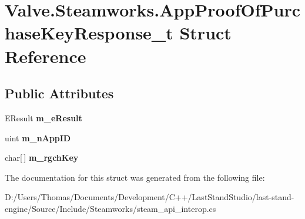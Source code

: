 \hypertarget{structValve_1_1Steamworks_1_1AppProofOfPurchaseKeyResponse__t}{}\section{Valve.\+Steamworks.\+App\+Proof\+Of\+Purchase\+Key\+Response\+\_\+t Struct Reference}
\label{structValve_1_1Steamworks_1_1AppProofOfPurchaseKeyResponse__t}
\subsection*{Public Attributes}
\begin{DoxyCompactItemize}
\item 
\hypertarget{structValve_1_1Steamworks_1_1AppProofOfPurchaseKeyResponse__t_abcb40b93a942c7a7b2475c676a807679}{}E\+Result {\bfseries m\+\_\+e\+Result}\label{structValve_1_1Steamworks_1_1AppProofOfPurchaseKeyResponse__t_abcb40b93a942c7a7b2475c676a807679}

\item 
\hypertarget{structValve_1_1Steamworks_1_1AppProofOfPurchaseKeyResponse__t_ac9119233dffae29b25286fbe687e32ee}{}uint {\bfseries m\+\_\+n\+App\+I\+D}\label{structValve_1_1Steamworks_1_1AppProofOfPurchaseKeyResponse__t_ac9119233dffae29b25286fbe687e32ee}

\item 
\hypertarget{structValve_1_1Steamworks_1_1AppProofOfPurchaseKeyResponse__t_ad1a0454bbaf073887abac25341afc82c}{}char\mbox{[}$\,$\mbox{]} {\bfseries m\+\_\+rgch\+Key}\label{structValve_1_1Steamworks_1_1AppProofOfPurchaseKeyResponse__t_ad1a0454bbaf073887abac25341afc82c}

\end{DoxyCompactItemize}


The documentation for this struct was generated from the following file\+:\begin{DoxyCompactItemize}
\item 
D\+:/\+Users/\+Thomas/\+Documents/\+Development/\+C++/\+Last\+Stand\+Studio/last-\/stand-\/engine/\+Source/\+Include/\+Steamworks/steam\+\_\+api\+\_\+interop.\+cs\end{DoxyCompactItemize}
